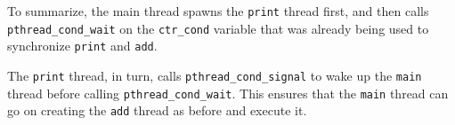 \documentclass[runningheads,a4paper]{report}
\begin{document}
To summarize, the main thread spawns the \texttt{print} thread first,
and then calls \texttt{pthread\_cond\_wait} on the \texttt{ctr\_cond}
variable that was already being used to synchronize \texttt{print} and
\texttt{add}.

The \texttt{print} thread, in turn, calls
\texttt{pthread\_cond\_signal} to wake up the \texttt{main} thread
before calling \texttt{pthread\_cond\_wait}. This ensures that the
\texttt{main} thread can go on creating the \texttt{add} thread as
before and execute it.
\end{document}
